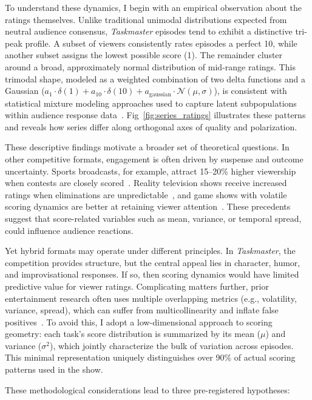 \documentclass[10pt,letterpaper]{article}
\begin{document}
To understand these dynamics, I begin with an empirical observation about the ratings themselves. Unlike traditional unimodal distributions expected from neutral audience consensus, \textit{Taskmaster} episodes tend to exhibit a distinctive tri-peak profile. A subset of viewers consistently rates episodes a perfect 10, while another subset assigns the lowest possible score (1). The remainder cluster around a broad, approximately normal distribution of mid-range ratings. This trimodal shape, modeled as a weighted combination of two delta functions and a Gaussian ($a_1 \cdot \delta(1) + a_{10} \cdot \delta(10) + a_{\text{gaussian}} \cdot \mathcal{N}(\mu, \sigma)$), is consistent with statistical mixture modeling approaches used to capture latent subpopulations within audience response data~\cite{McLachlan2000}. Fig~\ref{fig:series_ratings} illustrates these patterns and reveals how series differ along orthogonal axes of quality and polarization.

These descriptive findings motivate a broader set of theoretical questions. In other competitive formats, engagement is often driven by suspense and outcome uncertainty. Sports broadcasts, for example, attract 15--20\% higher viewership when contests are closely scored~\cite{rottenberg1956,fort2003}. Reality television shows receive increased ratings when eliminations are unpredictable~\cite{hall2009}, and game shows with volatile scoring dynamics are better at retaining viewer attention~\cite{vorderer2004}. These precedents suggest that score-related variables such as mean, variance, or temporal spread, could influence audience reactions.

Yet hybrid formats may operate under different principles. In \textit{Taskmaster}, the competition provides structure, but the central appeal lies in character, humor, and improvisational responses. If so, then scoring dynamics would have limited predictive value for viewer ratings. Complicating matters further, prior entertainment research often uses multiple overlapping metrics (e.g., volatility, variance, spread), which can suffer from multicollinearity and inflate false positives~\cite{gelman2007}. To avoid this, I adopt a low-dimensional approach to scoring geometry: each task’s score distribution is summarized by its mean ($\mu$) and variance ($\sigma^2$), which jointly characterize the bulk of variation across episodes. This minimal representation uniquely distinguishes over 90\% of actual scoring patterns used in the show.

These methodological considerations lead to three pre-registered hypotheses:
\end{document}
